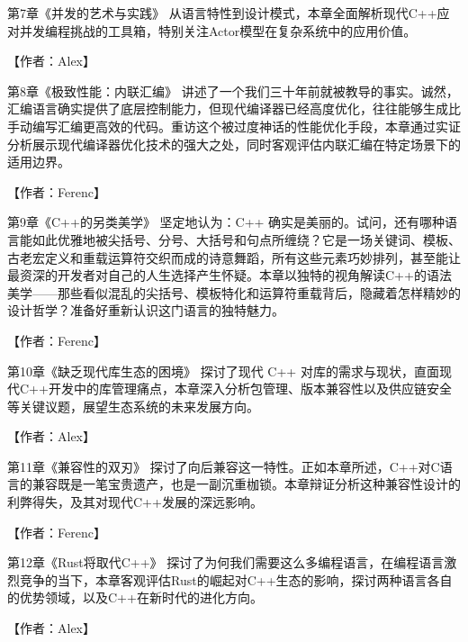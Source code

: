 \hspace*{\fill}

第7章《并发的艺术与实践》 从语言特性到设计模式，本章全面解析现代C++应对并发编程挑战的工具箱，特别关注Actor模型在复杂系统中的应用价值。

【作者：Alex】

\hspace*{\fill}

第8章《极致性能：内联汇编》 讲述了一个我们三十年前就被教导的事实。诚然，汇编语言确实提供了底层控制能力，但现代编译器已经高度优化，往往能够生成比手动编写汇编更高效的代码。重访这个被过度神话的性能优化手段，本章通过实证分析展示现代编译器优化技术的强大之处，同时客观评估内联汇编在特定场景下的适用边界。

【作者：Ferenc】

\hspace*{\fill}

第9章《C++的另类美学》 坚定地认为：C++ 确实是美丽的。试问，还有哪种语言能如此优雅地被尖括号、分号、大括号和句点所缠绕？它是一场关键词、模板、古老宏定义和重载运算符交织而成的诗意舞蹈，所有这些元素巧妙排列，甚至能让最资深的开发者对自己的人生选择产生怀疑。本章以独特的视角解读C++的语法美学——那些看似混乱的尖括号、模板特化和运算符重载背后，隐藏着怎样精妙的设计哲学？准备好重新认识这门语言的独特魅力。

【作者：Ferenc】

\hspace*{\fill}

第10章《缺乏现代库生态的困境》 探讨了现代 C++ 对库的需求与现状，直面现代C++开发中的库管理痛点，本章深入分析包管理、版本兼容性以及供应链安全等关键议题，展望生态系统的未来发展方向。

【作者：Alex】

\hspace*{\fill}

第11章《兼容性的双刃》 探讨了向后兼容这一特性。正如本章所述，C++对C语言的兼容既是一笔宝贵遗产，也是一副沉重枷锁。本章辩证分析这种兼容性设计的利弊得失，及其对现代C++发展的深远影响。

【作者：Ferenc】

\hspace*{\fill}

第12章《Rust将取代C++》 探讨了为何我们需要这么多编程语言，在编程语言激烈竞争的当下，本章客观评估Rust的崛起对C++生态的影响，探讨两种语言各自的优势领域，以及C++在新时代的进化方向。

【作者：Alex】


